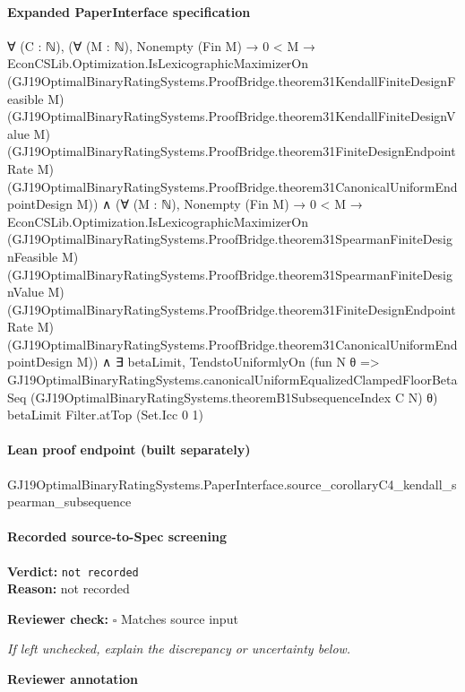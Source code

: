 \documentclass[10pt]{article}
\newcommand{\reviewerbox}{%
  \par\noindent\fbox{\parbox{0.96\linewidth}{\rule{0pt}{0.38in}}}\par
}
\newcommand{\reviewmatch}[1]{%
  \par\noindent\textbf{Reviewer check:} $\square$\; #1\par
  \noindent\emph{If left unchecked, explain the discrepancy or uncertainty below.}\par
}
\begin{document}
\paragraph{Expanded PaperInterface specification}
\begin{ReviewVerbatim}
∀ (C : ℕ),
  (∀ (M : ℕ),
      Nonempty (Fin M) →
        0 < M →
          EconCSLib.Optimization.IsLexicographicMaximizerOn
            (GJ19OptimalBinaryRatingSystems.ProofBridge.theorem31KendallFiniteDesignFeasible M)
            (GJ19OptimalBinaryRatingSystems.ProofBridge.theorem31KendallFiniteDesignValue M)
            (GJ19OptimalBinaryRatingSystems.ProofBridge.theorem31FiniteDesignEndpointRate M)
            (GJ19OptimalBinaryRatingSystems.ProofBridge.theorem31CanonicalUniformEndpointDesign M)) ∧
    (∀ (M : ℕ),
        Nonempty (Fin M) →
          0 < M →
            EconCSLib.Optimization.IsLexicographicMaximizerOn
              (GJ19OptimalBinaryRatingSystems.ProofBridge.theorem31SpearmanFiniteDesignFeasible M)
              (GJ19OptimalBinaryRatingSystems.ProofBridge.theorem31SpearmanFiniteDesignValue M)
              (GJ19OptimalBinaryRatingSystems.ProofBridge.theorem31FiniteDesignEndpointRate M)
              (GJ19OptimalBinaryRatingSystems.ProofBridge.theorem31CanonicalUniformEndpointDesign M)) ∧
      ∃ betaLimit,
        TendstoUniformlyOn
          (fun N θ =>
            GJ19OptimalBinaryRatingSystems.canonicalUniformEqualizedClampedFloorBetaSeq
              (GJ19OptimalBinaryRatingSystems.theoremB1SubsequenceIndex C N) θ)
          betaLimit Filter.atTop (Set.Icc 0 1)
\end{ReviewVerbatim}

\paragraph{Lean proof endpoint (built separately)}\begin{ReviewVerbatim}
GJ19OptimalBinaryRatingSystems.PaperInterface.source_corollaryC4_kendall_spearman_subsequence
\end{ReviewVerbatim}

\paragraph{Recorded source-to-Spec screening}
\textbf{Verdict:} \texttt{not recorded}
\\
\textbf{Reason:} not recorded
\reviewmatch{Matches source input}
\noindent\textbf{Reviewer annotation}\par
\reviewerbox
\clearpage
\hypertarget{source-claim-196d59db7138fcbd}{}
\end{document}
